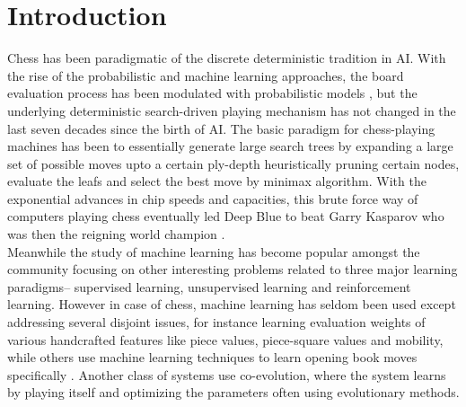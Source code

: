 \chapter{Introduction}
\label{chap:introduction}
Chess has been paradigmatic of the discrete deterministic tradition in AI. 
With the rise of the probabilistic and machine learning approaches, the board 
evaluation process has been modulated with probabilistic models 
\cite{baxter1999tdleaf, baxter1999knightcap}, but the 
underlying deterministic search-driven playing mechanism has not changed in the 
last seven decades since the birth of AI. The basic paradigm for chess-playing 
machines  has been to essentially 
generate large search trees by expanding a large set of possible moves upto 
a certain ply-depth heuristically pruning certain nodes, evaluate the leafs 
and select the best move by minimax algorithm. With the exponential advances in 
chip speeds and capacities, this brute force way of computers playing chess 
eventually led Deep Blue to beat Garry Kasparov who was then the reigning world 
champion \cite{campbell2002deep}.\\

Meanwhile the study of machine learning has become popular 
amongst the community focusing on other interesting problems related to three 
major learning paradigms-- supervised learning, unsupervised learning and 
reinforcement learning. However in case of chess, machine learning has 
seldom been used except addressing several disjoint issues, for instance 
learning evaluation weights of various handcrafted features like piece 
values\cite{beal1997learning}, piece-square values\cite{beal1999learning} and 
mobility, while others use machine learning techniques to learn 
opening book moves specifically \cite{hyatt1999book}. Another class of systems 
use co-evolution, where the system learns by 
playing itself 
\cite{vazquez-coello-12_evolutionary_hooke-jeeves-algo_chess-evaluation}  and 
optimizing the parameters 
\cite{bovskovic-brest-11_tuning-chess-evaluation-w-differential-evolution} 
often using evolutionary methods.\\

